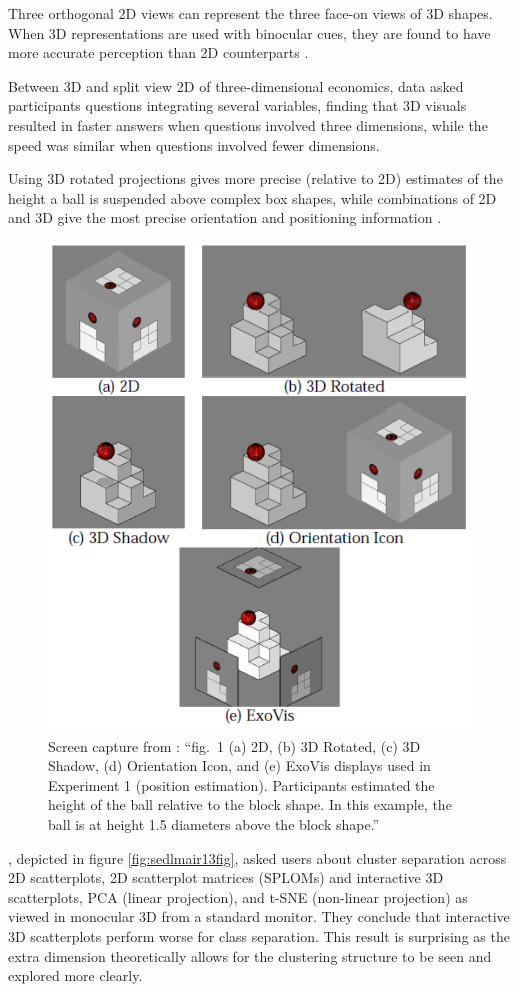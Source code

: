 \documentclass{monashthesis}
\begin{document}
Three orthogonal 2D views can represent the three face-on views of 3D shapes. When 3D representations are used with binocular cues, they are found to have more accurate perception than 2D counterparts \autocite{lee_effects_1986}.

Between 3D and split view 2D of three-dimensional economics, data \textcite{wickens_implications_1994} asked participants questions integrating several variables, finding that 3D visuals resulted in faster answers when questions involved three dimensions, while the speed was similar when questions involved fewer dimensions.

Using 3D rotated projections gives more precise (relative to 2D) estimates of the height a ball is suspended above complex box shapes, while combinations of 2D and 3D give the most precise orientation and positioning information \autocite[depicted in figure \ref{fig:tory06fig}]{tory_visualization_2006}.



\begin{figure}

{\centering \includegraphics[width=0.5\linewidth]{./figures/tory06fig} 

}

\caption{Screen capture from \textcite{tory_visualization_2006}: ``fig.~1 (a) 2D, (b) 3D Rotated, (c) 3D Shadow, (d) Orientation Icon, and (e) ExoVis displays used in Experiment 1 (position estimation). Participants estimated the height of the ball relative to the block shape. In this example, the ball is at height 1.5 diameters above the block shape.''}\label{fig:tory06fig}
\end{figure}

\textcite{sedlmair_empirical_2013}, depicted in figure \ref{fig:sedlmair13fig}, asked users about cluster separation across 2D scatterplots, 2D scatterplot matrices (SPLOMs) and interactive 3D scatterplots, PCA (linear projection), and t-SNE (non-linear projection) as viewed in monocular 3D from a standard monitor. They conclude that interactive 3D scatterplots perform worse for class separation. This result is surprising as the extra dimension theoretically allows for the clustering structure to be seen and explored more clearly.
\end{document}
